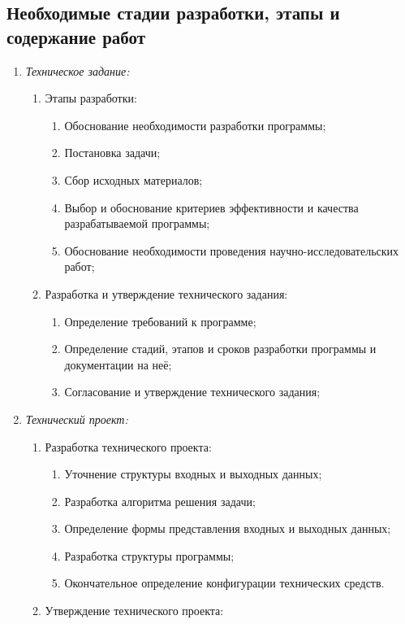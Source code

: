 \documentclass[a4paper,12pt,reqno]{article}
\begin{document}
	\subsection{Необходимые стадии разработки, этапы и содержание работ}
	\begin{enumerate}
		\item \textit{Техническое задание:}
		\begin{enumerate}
			\item Этапы разработки:
			\begin{enumerate}
				\item Обоснование необходимости разработки программы; 
				\item Постановка задачи; 
				\item Сбор исходных материалов; 
				\item Выбор и обоснование критериев эффективности и качества разрабатываемой программы; 
				\item Обоснование необходимости проведения научно-исследовательских работ; 
			\end{enumerate}
			\item Разработка и утверждение технического задания:
			\begin{enumerate}
				\item Определение требований к программе; 
				\item Определение стадий, этапов и сроков разработки программы и документации на неё; 
				\item Согласование и утверждение технического задания; 
			\end{enumerate}
		\end{enumerate}
		\item \textit{Технический проект:}
		\begin{enumerate}
			\item Разработка технического проекта:
			\begin{enumerate}
				\item Уточнение структуры входных и выходных данных; 
				\item Разработка алгоритма решения задачи; 
				\item Определение формы представления входных и выходных данных; 
				\item Разработка структуры программы; 
				\item Окончательное определение конфигурации технических средств. 
			\end{enumerate}
			\item Утверждение технического проекта:

\end{enumerate}
\end{enumerate}
\end{document}
